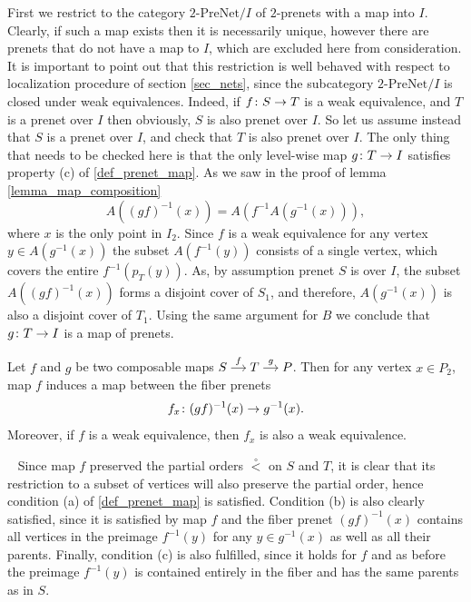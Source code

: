 \documentclass[letterpaper,12pt,leqno]{article}
\numberwithin{equation}{theorem}
\def\PreNet{\textrm{-}\mathrm{PreNet}}
\def\proof{\noindent{\em Proof:}\ }
\def\lesub{\mathop{<}\limits}
\def\pless{\lesub^\circ}
\begin{document}
\begin{nparagraph}
First we restrict to the category $2\PreNet / I$ of $2$-prenets with a map into $I$. Clearly, if such a map exists then it is necessarily unique, however there are
prenets that do not have a map to $I$, which are excluded here from consideration. It is important to point out that this restriction is well behaved with respect to localization
procedure of section \ref{sec_nets}, since the subcategory $2\PreNet/I$ is closed under weak equivalences. Indeed, if $f\colon S \to T$ is a weak equivalence, and $T$ is a prenet over $I$
then obviously, $S$ is also prenet over $I$. So let us assume instead that $S$ is a prenet over $I$, and check that $T$ is also prenet over $I$. The only thing that needs to be checked here
is that the only level-wise map $g\colon T \to I$ satisfies property (c) of \ref{def_prenet_map}. As we saw in the proof of lemma \ref{lemma_map_composition}
$$
A((gf)^{-1}(x)) = A(f^{-1} A(g^{-1}(x))),
$$
where $x$ is the only point in $I_2$. Since $f$ is a weak equivalence for any vertex $y \in A(g^{-1}(x))$ the subset $A(f^{-1}(y))$ consists of a single vertex, which covers the entire
$f^{-1}(p_T(y))$. As, by assumption prenet $S$ is over $I$, the subset $A((gf)^{-1}(x))$ forms a disjoint cover of $S_1$, and therefore, $A(g^{-1}(x))$ is also a disjoint cover of $T_1$.
Using the same argument for $B$ we conclude that $g\colon T \to I$ is a map of prenets.
\end{nparagraph}

\begin{lemma}
\label{lemma_fib_map}
Let $f$ and $g$ be two composable maps $\begin{tikzcd}[cramped,sep=small] S \ar[r, "f"] & T \ar[r, "g"] & P\end{tikzcd}$.
Then for any vertex $x \in P_2$, map $f$ induces a map between the fiber prenets
$$
f_x\colon (gf)^{-1}(x) \to g^{-1}(x).
$$
Moreover, if $f$ is a weak equivalence, then $f_x$ is also a weak equivalence.
\end{lemma}
\proof
Since map $f$ preserved the partial orders $\pless$ on $S$ and $T$, it is clear that its restriction to a subset of vertices will also preserve the partial order, hence
condition (a) of \ref{def_prenet_map} is satisfied. Condition (b) is also clearly satisfied, since it is satisfied by map $f$ and the fiber prenet $(gf)^{-1}(x)$ contains
all vertices in the preimage $f^{-1}(y)$ for any $y \in g^{-1}(x)$ as well as all their parents. Finally, condition (c) is also fulfilled, since it holds for $f$
and as before the preimage $f^{-1}(y)$ is contained entirely in the fiber and has the same parents as in $S$.
\end{document}
